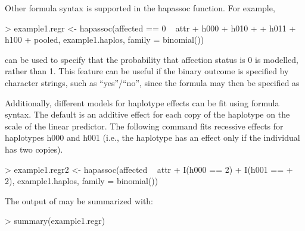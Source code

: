\documentclass[article, shortnames]{jss}
\begin{document}
Other formula syntax is supported in the hapassoc function.
For example,
\begin{Schunk}
\begin{Sinput}
> example1.regr <- hapassoc(affected == 0 ~ attr + h000 + h010 + 
+     h011 + h100 + pooled, example1.haplos, family = binomial())
\end{Sinput}
\end{Schunk}
can be used to specify that the probability that affection status is 0 is
modelled, rather than 1. This feature can be useful if the binary outcome 
is specified by character strings, such as ``yes''/``no'', since the 
formula may then be specified as 

Additionally, different models for haplotype effects can be fit using
 formula syntax. The default is an additive effect for each 
copy of the haplotype on the scale of the linear predictor. The following 
command fits recessive effects for haplotypes h000 and h001 
(i.e., the haplotype has an effect only if the individual has two copies).
\begin{Schunk}
\begin{Sinput}
> example1.regr2 <- hapassoc(affected ~ attr + I(h000 == 2) + I(h001 == 
+     2), example1.haplos, family = binomial())
\end{Sinput}
\end{Schunk}
The output of  may be summarized with:
\begin{Schunk}
\begin{Sinput}
> summary(example1.regr)
\end{Sinput}
\end{Schunk}
\end{document}
